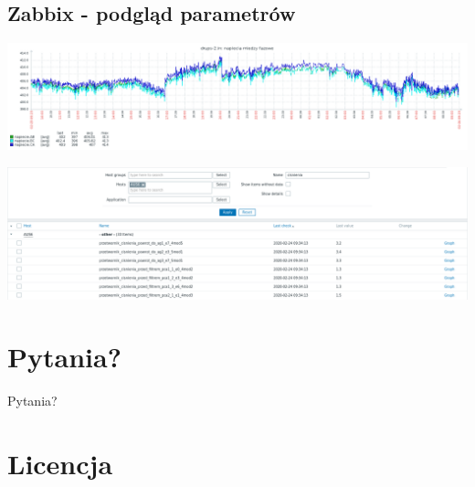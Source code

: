 \documentclass[aspectratio=169]{beamer} %
\begin{document}
\subsection{Zabbix - podgląd parametrów}
\begin{frame}[fragile]
\begin{center}\includegraphics[width=.9\textwidth]{monitoring_obiektow_data_center-img/monitoring_dc-napiecie}\end{center}
\begin{center}\includegraphics[width=.8\textwidth]{monitoring_obiektow_data_center-img/monitoring_dc-cisnienia}\end{center}
\end{frame}


\section{Pytania?}

\begin{frame}
\begin{center}
\LARGE Pytania?
\end{center}
\end{frame}


\section{Licencja}
\end{document}
